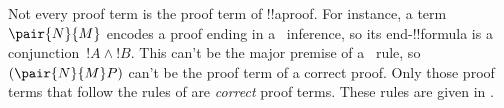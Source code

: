 \documentclass[../../../include/open-logic-section]{subfiles}
\begin{document}
Not every proof term is the proof term of !!a{proof}. For instance,
a term $\pair{N}{M}$ encodes a proof ending in a~\Intro{\land}
inference, so its end-!!{formula} is a conjunction~$!A \land !B$. This
can't be the major premise of a~\Elim{\lif} rule, so $(\pair{N}{M}P)$
can't be the proof term of a correct proof. Only those proof terms
that follow the rules of  are \emph{correct} proof terms.
These rules are given in .


\end{document}
